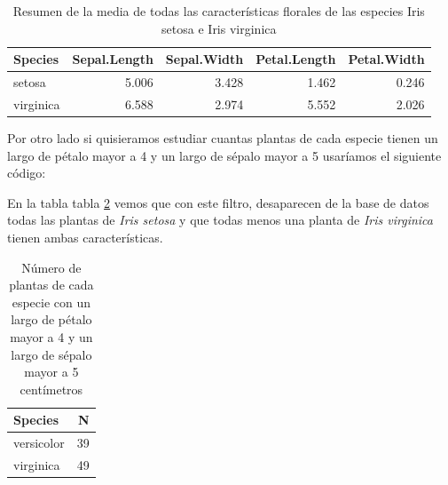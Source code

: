 \documentclass[]{book}
\newenvironment{Shaded}{\begin{snugshade}}{\end{snugshade}}
\newcommand{\DataTypeTok}[1]{\textcolor[rgb]{0.13,0.29,0.53}{#1}}
\newcommand{\DecValTok}[1]{\textcolor[rgb]{0.00,0.00,0.81}{#1}}
\newcommand{\KeywordTok}[1]{\textcolor[rgb]{0.13,0.29,0.53}{\textbf{#1}}}
\newcommand{\NormalTok}[1]{#1}
\newcommand{\OperatorTok}[1]{\textcolor[rgb]{0.81,0.36,0.00}{\textbf{#1}}}
\newcommand{\StringTok}[1]{\textcolor[rgb]{0.31,0.60,0.02}{#1}}
\begin{document}
\begin{table}

\caption{\label{tab:MenosVersicolor}Resumen de la media de todas las características florales de las especies Iris setosa e Iris virginica}
\centering
\begin{tabular}[t]{lrrrr}
\toprule
Species & Sepal.Length & Sepal.Width & Petal.Length & Petal.Width\\
\midrule
setosa & 5.006 & 3.428 & 1.462 & 0.246\\
virginica & 6.588 & 2.974 & 5.552 & 2.026\\
\bottomrule
\end{tabular}
\end{table}

Por otro lado si quisieramos estudiar cuantas plantas de cada especie
tienen un largo de pétalo mayor a 4 y un largo de sépalo mayor a 5
usaríamos el siguiente código:

\begin{Shaded}
\end{Shaded}

En la tabla tabla \ref{tab:Numero} vemos que con este filtro,
desaparecen de la base de datos todas las plantas de \emph{Iris setosa}
y que todas menos una planta de \emph{Iris virginica} tienen ambas
características.

\begin{table}

\caption{\label{tab:Numero}Número de plantas de cada especie con un largo de pétalo mayor a 4 y un largo de sépalo mayor a 5 centímetros}
\centering
\begin{tabular}[t]{lr}
\toprule
Species & N\\
\midrule
versicolor & 39\\
virginica & 49\\
\bottomrule
\end{tabular}
\end{table}
\end{document}
